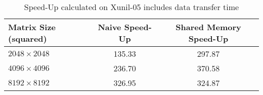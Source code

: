 \documentclass[12pt]{article}
\begin{document}
\begin{table}[H]
\centering
\begin{tabular}{@{}|l|c|c|}
\hline
Matrix Size (squared) & Naive Speed-Up  & Shared Memory Speed-Up \\ \hline
$2048 \times 2048$      & 135.33          & 297.87  \\ \hline 
$4096 \times 4096$      & 236.70          & 370.58 \\ \hline 
$8192 \times 8192$      & 326.95          & 324.87 \\ \hline 
\end{tabular}
\caption{Speed-Up calculated on Xunil-05 includes data transfer time}
\end{table}
\end{document}
